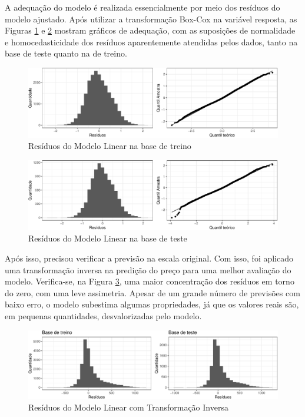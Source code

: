 \documentclass[
	12pt,				%
	a4paper,		%
	oneside,    %
	chapter=TITLE,		   %
	section=TITLE,		   %
	subsection=TITLE,	   %
	subsubsection=TITLE, %
	english,			%
	french,				%
	spanish,			%
	brazil,				%
]{abntex2}
\begin{document}
A adequação do modelo é realizada essencialmente por meio dos resíduos
do modelo ajustado. Após utilizar a transformação Box-Cox na variável
resposta, as Figuras \ref{resid_ml} e \ref{resid_ml_test} mostram
gráficos de adequação, com as suposições de normalidade e
homocedasticidade dos resíduos aparentemente atendidas pelos dados,
tanto na base de teste quanto na de treino.

\begin{figure}
\centering
\includegraphics{00-TCC_files/figure-latex/resid_ml-1.pdf}
\caption{\label{resid_ml}Resíduos do Modelo Linear na base de treino}
\end{figure}

\begin{figure}
\centering
\includegraphics{00-TCC_files/figure-latex/resid_ml_test-1.pdf}
\caption{\label{resid_ml_test}Resíduos do Modelo Linear na base de
teste}
\end{figure}

Após isso, precisou verificar a previsão na escala original. Com isso,
foi aplicado uma transformação inversa na predição do preço para uma
melhor avaliação do modelo. Verifica-se, na Figura \ref{resid_ml_inv},
uma maior concentração dos resíduos em torno do zero, com uma leve
assimetria. Apesar de um grande número de previsões com baixo erro, o
modelo subestima algumas propriedades, já que os valores reais são, em
pequenas quantidades, desvalorizadas pelo modelo.

\begin{figure}
\centering
\includegraphics{00-TCC_files/figure-latex/resid_ml_inv-1.pdf}
\caption{\label{resid_ml_inv}Resíduos do Modelo Linear com Transformação
Inversa}
\end{figure}
\end{document}
